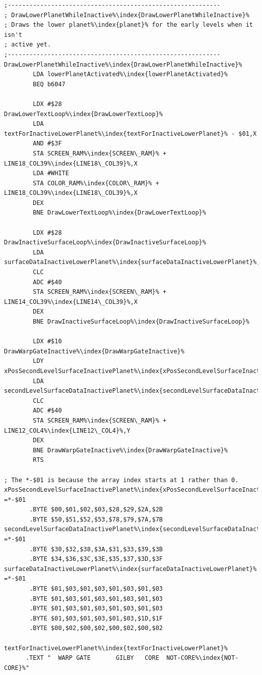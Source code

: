 \begin{lstlisting}[caption=Draw the inactive lower planet\index{planet}.,basicstyle=\tiny,escapechar=\%]
;-----------------------------------------------------------
; DrawLowerPlanetWhileInactive%\index{DrawLowerPlanetWhileInactive}%
; Draws the lower planet%\index{planet}% for the early levels when it isn't
; active yet.
;-----------------------------------------------------------
DrawLowerPlanetWhileInactive%\index{DrawLowerPlanetWhileInactive}%
        LDA lowerPlanetActivated%\index{lowerPlanetActivated}%
        BEQ b6047

        LDX #$28
DrawLowerTextLoop%\index{DrawLowerTextLoop}%   
        LDA textForInactiveLowerPlanet%\index{textForInactiveLowerPlanet}% - $01,X
        AND #$3F
        STA SCREEN_RAM%\index{SCREEN\_RAM}% + LINE18_COL39%\index{LINE18\_COL39}%,X
        LDA #WHITE
        STA COLOR_RAM%\index{COLOR\_RAM}% + LINE18_COL39%\index{LINE18\_COL39}%,X
        DEX
        BNE DrawLowerTextLoop%\index{DrawLowerTextLoop}%

        LDX #$28
DrawInactiveSurfaceLoop%\index{DrawInactiveSurfaceLoop}%   
        LDA surfaceDataInactiveLowerPlanet%\index{surfaceDataInactiveLowerPlanet}%,X
        CLC
        ADC #$40
        STA SCREEN_RAM%\index{SCREEN\_RAM}% + LINE14_COL39%\index{LINE14\_COL39}%,X
        DEX
        BNE DrawInactiveSurfaceLoop%\index{DrawInactiveSurfaceLoop}%

        LDX #$10
DrawWarpGateInactive%\index{DrawWarpGateInactive}%   
        LDY xPosSecondLevelSurfaceInactivePlanet%\index{xPosSecondLevelSurfaceInactivePlanet}%,X
        LDA secondLevelSurfaceDataInactivePlanet%\index{secondLevelSurfaceDataInactivePlanet}%,X
        CLC
        ADC #$40
        STA SCREEN_RAM%\index{SCREEN\_RAM}% + LINE12_COL4%\index{LINE12\_COL4}%,Y
        DEX
        BNE DrawWarpGateInactive%\index{DrawWarpGateInactive}%
        RTS

; The *-$01 is because the array index starts at 1 rather than 0.
xPosSecondLevelSurfaceInactivePlanet%\index{xPosSecondLevelSurfaceInactivePlanet}% =*-$01
       .BYTE $00,$01,$02,$03,$28,$29,$2A,$2B
       .BYTE $50,$51,$52,$53,$78,$79,$7A,$7B
secondLevelSurfaceDataInactivePlanet%\index{secondLevelSurfaceDataInactivePlanet}% =*-$01 
       .BYTE $30,$32,$38,$3A,$31,$33,$39,$3B
       .BYTE $34,$36,$3C,$3E,$35,$37,$3D,$3F
surfaceDataInactiveLowerPlanet%\index{surfaceDataInactiveLowerPlanet}% =*-$01       
       .BYTE $01,$03,$01,$03,$01,$03,$01,$03
       .BYTE $01,$03,$01,$03,$01,$03,$01,$03
       .BYTE $01,$03,$01,$03,$01,$03,$01,$03
       .BYTE $01,$03,$01,$03,$01,$03,$1D,$1F
       .BYTE $00,$02,$00,$02,$00,$02,$00,$02

textForInactiveLowerPlanet%\index{textForInactiveLowerPlanet}%
      .TEXT "  WARP GATE       GILBY   CORE  NOT-CORE%\index{NOT-CORE}%"
\end{lstlisting}


